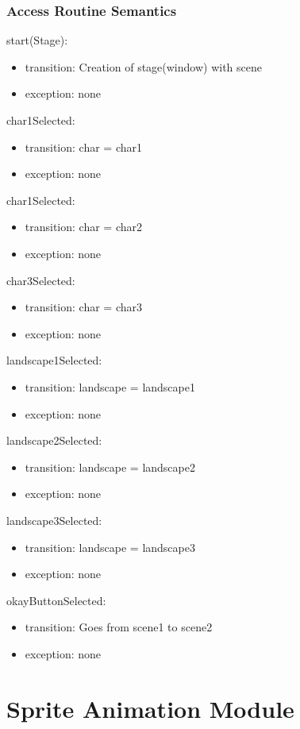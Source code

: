 \documentclass[12pt, titlepage]{article}
\begin{document}
\subsubsection {Access Routine Semantics}
start(Stage):
\begin{itemize}
\item transition: Creation of stage(window) with scene
\item exception: none
\end{itemize}
char1Selected:
\begin{itemize}
\item transition: char = char1
\item exception: none
\end{itemize}
char1Selected:
\begin{itemize}
\item transition: char = char2
\item exception: none
\end{itemize}
char3Selected:
\begin{itemize}
\item transition: char = char3
\item exception: none
\end{itemize}
landscape1Selected:
\begin{itemize}
\item transition: landscape = landscape1
\item exception: none
\end{itemize}
landscape2Selected:
\begin{itemize}
\item transition: landscape = landscape2
\item exception: none
\end{itemize}
landscape3Selected:
\begin{itemize}
\item transition: landscape = landscape3
\item exception: none
\end{itemize}
okayButtonSelected:
\begin{itemize}
\item transition: Goes from scene1 to scene2
\item exception: none
\end{itemize}



\newpage
\section {Sprite Animation Module}
\end{document}

